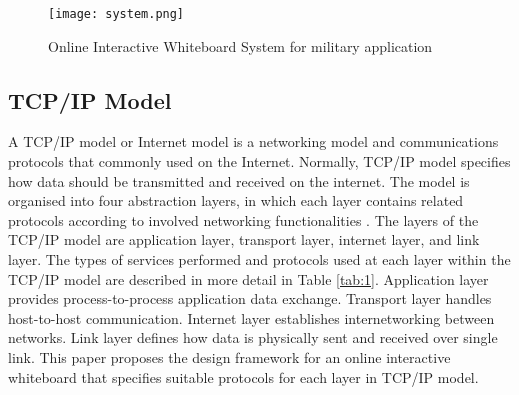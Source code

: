 \documentclass[conference]{IEEEtran}
\begin{document}
\begin{figure}[t]
\begin{center}
\texttt{[image: system.png]}
\caption{Online Interactive Whiteboard System for military application}
\label{fig:1}
\end{center}
\end{figure}

\subsection{TCP/IP Model}

A TCP/IP model or Internet model is a networking model and communications protocols that commonly used on the Internet. 
Normally, TCP/IP model specifies how data should be transmitted and received on the internet. The model is organised into four abstraction layers, in which each layer contains related protocols according to involved networking functionalities \cite{RFC1122, RFC1123}.
The layers of the TCP/IP model are application layer, transport layer, internet layer, and link layer. 
The types of services performed and protocols used at each layer within the TCP/IP model are described in more detail in Table \ref{tab:1}. 
Application layer provides process-to-process application data exchange. 
Transport layer handles host-to-host communication. Internet layer establishes internetworking between networks. 
Link layer defines how data is physically sent and received over single link. 
This paper proposes the design framework for an online interactive whiteboard that specifies suitable protocols for each layer in TCP/IP model.
\end{document}
